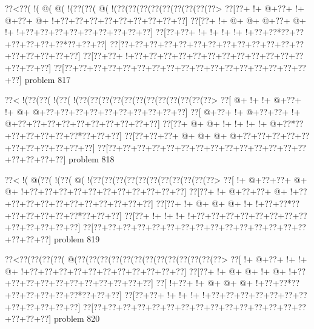 \vbox{\vbox{\goo
\0??<\0??(\- !(\- @(\- @(\- !(\0??(\0??(\- @(\- !(\0??(\0??(\0??(\0??(\0??(\0??(\0??(\0??(\0??>
\0??[\0??+\- !+\- @+\0??+\- !+\- @+\0??+\- @+\- !+\0??+\0??+\0??+\0??+\0??+\0??+\0??+\0??+\0??]
\0??[\0??+\- !+\- @+\- @+\- @+\0??+\- @+\- !+\- !+\0??+\0??+\0??+\0??+\0??+\0??+\0??+\0??+\0??]
\0??[\0??+\0??+\- !+\- !+\- !+\- !+\- !+\0??+\0??*\0??+\0??+\0??+\0??+\0??+\0??*\0??+\0??+\0??]
\0??[\0??+\0??+\0??+\0??+\0??+\0??+\0??+\0??+\0??+\0??+\0??+\0??+\0??+\0??+\0??+\0??+\0??+\0??]
\0??[\0??+\0??+\- !+\0??+\0??+\0??+\0??+\0??+\0??+\0??+\0??+\0??+\0??+\0??+\0??+\0??+\0??+\0??]
\0??[\0??+\0??+\0??+\0??+\0??+\0??+\0??+\0??+\0??+\0??+\0??+\0??+\0??+\0??+\0??+\0??+\0??+\0??]
}
\hfil problem 817\hfil\break
}



\vbox{\vbox{\goo
\0??<\- !(\0??(\0??(\- !(\0??(\- !(\0??(\0??(\0??(\0??(\0??(\0??(\0??(\0??(\0??(\0??(\0??(\0??>
\0??[\- @+\- !+\- !+\- @+\0??+\- !+\- @+\- @+\0??+\0??+\0??+\0??+\0??+\0??+\0??+\0??+\0??+\0??]
\0??[\- @+\0??+\- !+\- @+\0??+\0??+\- !+\- @+\0??+\0??+\0??+\0??+\0??+\0??+\0??+\0??+\0??+\0??]
\0??[\0??+\- @+\- @+\- !+\- !+\- !+\- !+\- @+\0??*\0??+\0??+\0??+\0??+\0??+\0??*\0??+\0??+\0??]
\0??[\0??+\0??+\0??+\- @+\- @+\- @+\- @+\0??+\0??+\0??+\0??+\0??+\0??+\0??+\0??+\0??+\0??+\0??]
\0??[\0??+\0??+\0??+\0??+\0??+\0??+\0??+\0??+\0??+\0??+\0??+\0??+\0??+\0??+\0??+\0??+\0??+\0??]
}
\hfil problem 818\hfil\break
}



\vbox{\vbox{\goo
\0??<\- !(\- @(\0??(\- !(\0??(\- @(\- !(\0??(\0??(\0??(\0??(\0??(\0??(\0??(\0??(\0??(\0??(\0??>
\0??[\- !+\- @+\0??+\0??+\- @+\- @+\- !+\0??+\0??+\0??+\0??+\0??+\0??+\0??+\0??+\0??+\0??+\0??]
\0??[\0??+\- !+\- @+\0??+\0??+\- @+\- !+\0??+\0??+\0??+\0??+\0??+\0??+\0??+\0??+\0??+\0??+\0??]
\0??[\0??+\- !+\- @+\- @+\- @+\- !+\- !+\0??+\0??*\0??+\0??+\0??+\0??+\0??+\0??*\0??+\0??+\0??]
\0??[\0??+\- !+\- !+\- !+\- !+\0??+\0??+\0??+\0??+\0??+\0??+\0??+\0??+\0??+\0??+\0??+\0??+\0??]
\0??[\0??+\0??+\0??+\0??+\0??+\0??+\0??+\0??+\0??+\0??+\0??+\0??+\0??+\0??+\0??+\0??+\0??+\0??]
}
\hfil problem 819\hfil\break
}



\vbox{\vbox{\goo
\0??<\0??(\0??(\0??(\0??(\- @(\0??(\0??(\0??(\0??(\0??(\0??(\0??(\0??(\0??(\0??(\0??(\0??(\0??>
\0??[\- !+\- @+\0??+\- !+\- !+\- @+\- !+\0??+\0??+\0??+\0??+\0??+\0??+\0??+\0??+\0??+\0??+\0??]
\0??[\0??+\- !+\- @+\- @+\- !+\- @+\- !+\0??+\0??+\0??+\0??+\0??+\0??+\0??+\0??+\0??+\0??+\0??]
\0??[\- !+\0??+\- !+\- @+\- @+\- @+\- !+\0??+\0??*\0??+\0??+\0??+\0??+\0??+\0??*\0??+\0??+\0??]
\0??[\0??+\0??+\- !+\- !+\- !+\- !+\0??+\0??+\0??+\0??+\0??+\0??+\0??+\0??+\0??+\0??+\0??+\0??]
\0??[\0??+\0??+\0??+\0??+\0??+\0??+\0??+\0??+\0??+\0??+\0??+\0??+\0??+\0??+\0??+\0??+\0??+\0??]
}
\hfil problem 820\hfil\break
}



